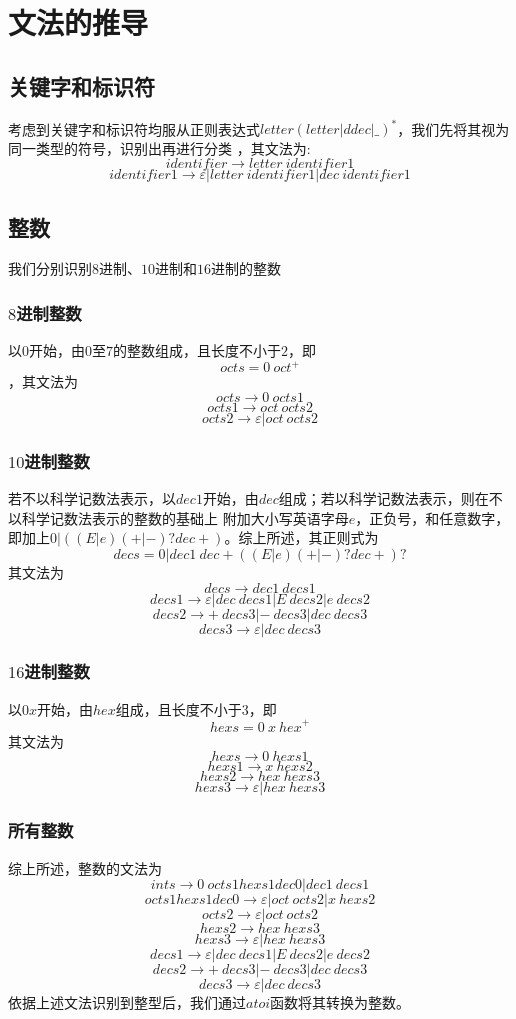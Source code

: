 \documentclass[UTF8]{ctexart}
\begin{document}
\section{文法的推导}
\subsection{关键字和标识符}
考虑到关键字和标识符均服从正则表达式$letter (letter|ddec|\_)^*$，我们先将其视为同一类型的符号，识别出再进行分类
，其文法为:
$$ identifier \rightarrow letter \ identifier1 $$
$$ identifier1 \rightarrow \varepsilon | letter \ identifier1 | dec \ identifier1 $$
\subsection{整数}
我们分别识别$8$进制、$10$进制和$16$进制的整数
\subsubsection{$8$进制整数}
以$0$开始，由$0$至$7$的整数组成，且长度不小于$2$，即
$$ octs = 0 \ {oct}^+ $$
，其文法为
$$ octs \rightarrow 0 \ octs1 $$
$$ octs1 \rightarrow oct \ octs2 $$
$$ octs2 \rightarrow \varepsilon | oct \ octs2 $$
\subsubsection{$10$进制整数}
若不以科学记数法表示，以$dec1$开始，由$dec$组成；若以科学记数法表示，则在不以科学记数法表示的整数的基础上
附加大小写英语字母$e$，正负号，和任意数字，即加上$0|((E|e)(+|-)?dec+)$。综上所述，其正则式为
$$ decs = 0 | dec1 \ dec+((E|e)(+|-)?dec+)? $$
其文法为
$$ decs \rightarrow dec1 \ decs1  $$
$$ decs1 \rightarrow \varepsilon | dec \ decs1 | E \ decs2 | e \ decs2 $$
$$ decs2 \rightarrow + \ decs3 | - \ decs3 | dec \ decs3  $$
$$ decs3 \rightarrow \varepsilon | dec \ decs3  $$
\subsubsection{$16$进制整数}
以$0x$开始，由$hex$组成，且长度不小于$3$，即
$$ hexs = 0 \ x  \ {hex}^+ $$
其文法为
$$ hexs \rightarrow 0 \ hexs1 $$
$$ hexs1 \rightarrow x \ hexs2 $$
$$ hexs2 \rightarrow hex \ hexs3 $$
$$ hexs3 \rightarrow \varepsilon | hex \ hexs3 $$
\subsubsection{所有整数}
综上所述，整数的文法为
$$ ints \rightarrow 0 \ octs1hexs1dec0 | dec1 \ decs1 $$
$$ octs1hexs1dec0 \rightarrow \varepsilon | oct \ octs2 | x \ hexs2 $$
$$ octs2 \rightarrow \varepsilon | oct \ octs2 $$
$$ hexs2 \rightarrow hex \ hexs3 $$
$$ hexs3 \rightarrow \varepsilon | hex \ hexs3 $$
$$ decs1 \rightarrow \varepsilon | dec \ decs1 | E \ decs2 | e \ decs2 $$
$$ decs2 \rightarrow + \ decs3 | - \ decs3 | dec \ decs3  $$
$$ decs3 \rightarrow \varepsilon | dec \ decs3  $$
依据上述文法识别到整型后，我们通过$atoi$函数将其转换为整数。
\end{document}
